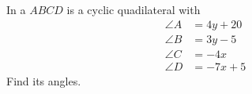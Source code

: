 \begin{flushleft}
In a $ABCD$ is a cyclic quadilateral with 
\begin{align}
\angle A &= 4y + 20 \\
\angle B &= 3y - 5 \\
\angle C &= -4x \\
\angle D &= -7x + 5 
\end{align}
Find its angles.
\end{flushleft}
